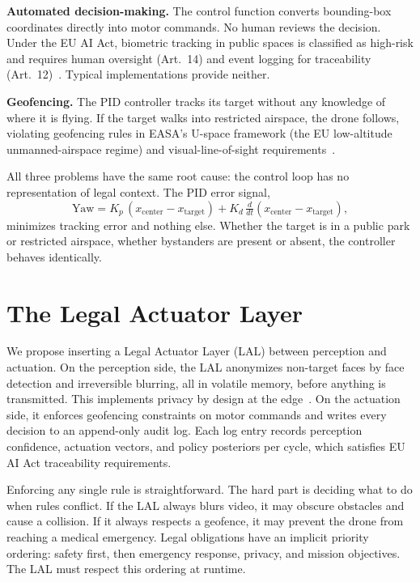 \documentclass[10pt,twocolumn]{article}
\begin{document}
\textbf{Automated decision-making.} The control function converts bounding-box coordinates directly into motor commands. No human reviews the decision. Under the EU AI Act, biometric tracking in public spaces is classified as high-risk and requires human oversight (Art.~14) and event logging for traceability (Art.~12)~\cite{euai2024}. Typical implementations provide neither.

\textbf{Geofencing.} The PID controller tracks its target without any knowledge of where it is flying. If the target walks into restricted airspace, the drone follows, violating geofencing rules in EASA's U-space framework (the EU low-altitude unmanned-airspace regime) and visual-line-of-sight requirements~\cite{easa2019}.

All three problems have the same root cause: the control loop has no representation of legal context. The PID error signal,
\begin{equation}
    \text{Yaw} = K_p\,(x_{\text{center}} - x_{\text{target}}) + K_d\,\tfrac{d}{dt}(x_{\text{center}} - x_{\text{target}}),
\end{equation}
minimizes tracking error and nothing else. Whether the target is in a public park or restricted airspace, whether bystanders are present or absent, the controller behaves identically.


\section{The Legal Actuator Layer}
\label{sec:lal}

We propose inserting a Legal Actuator Layer (LAL) between perception and actuation. On the perception side, the LAL anonymizes non-target faces by face detection and irreversible blurring, all in volatile memory, before anything is transmitted. This implements privacy by design at the edge~\cite{cavoukian2009}. On the actuation side, it enforces geofencing constraints on motor commands and writes every decision to an append-only audit log. Each log entry records perception confidence, actuation vectors, and policy posteriors per cycle, which satisfies EU AI Act traceability requirements.

Enforcing any single rule is straightforward. The hard part is deciding what to do when rules conflict. If the LAL always blurs video, it may obscure obstacles and cause a collision. If it always respects a geofence, it may prevent the drone from reaching a medical emergency. Legal obligations have an implicit priority ordering: safety first, then emergency response, privacy, and mission objectives. The LAL must respect this ordering at runtime.
\end{document}
